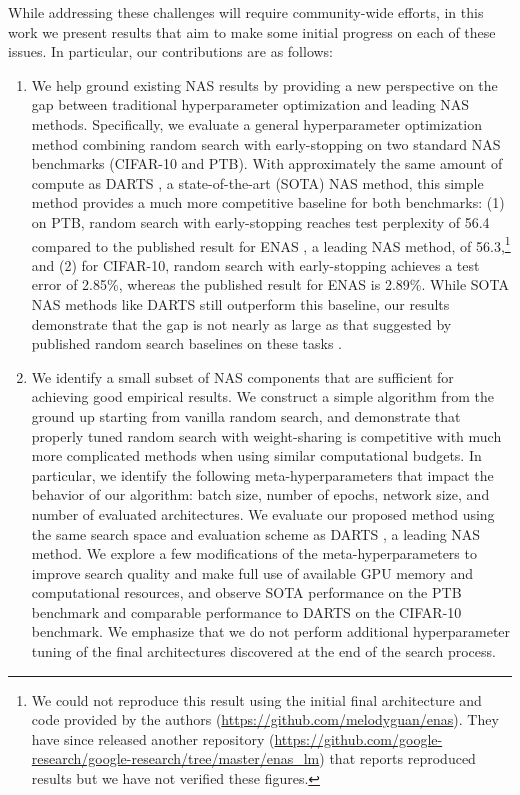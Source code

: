 \documentclass[acmlarge, nonacm]{acmart}
\begin{document}
While addressing these challenges will require community-wide efforts,
 in this work we present results that aim to make some initial progress on each of these issues. In particular, our contributions are as follows:
\begin{enumerate}[leftmargin=*]
    \item We help ground existing NAS results by providing a new perspective on the gap between traditional hyperparameter optimization and leading NAS methods. Specifically, we evaluate a general hyperparameter optimization method combining random search with early-stopping \citep{asha} on two standard NAS benchmarks (CIFAR-10 and PTB).  With approximately the same amount of compute as DARTS \citep{liu2018darts}, a state-of-the-art (SOTA) NAS method, this simple method provides a much more competitive baseline for both benchmarks: (1) on PTB, random search with early-stopping reaches test perplexity of 56.4 compared to the published result for ENAS \citep{pham18ENAS}, a leading NAS method, of 56.3,\footnote{We could not reproduce this result using the initial final architecture and code provided by the authors (\url{https://github.com/melodyguan/enas}).  They have since released another repository  (\url{https://github.com/google-research/google-research/tree/master/enas_lm}) that reports reproduced results but we have not verified these figures.} and (2) for CIFAR-10, random search with early-stopping achieves a test error of 2.85\%, whereas the published result for ENAS is 2.89\%.  While SOTA NAS methods like DARTS still outperform this baseline, our results demonstrate that the gap is not nearly as large as that suggested by published random search baselines on these tasks \citep{pham18ENAS,liu2018darts}.
    \item  We identify a small subset of NAS components that are sufficient for achieving good empirical results.  We construct a simple algorithm from the ground up starting from vanilla random search, 
    and demonstrate that properly tuned random search with weight-sharing is competitive with much more complicated methods when using similar computational budgets.  In particular, we identify the following meta-hyperparameters that impact the behavior of our algorithm: batch size, number of epochs, network size, and number of evaluated architectures. We  evaluate our proposed method using the same search space and evaluation scheme as DARTS \citep{liu2018darts}, a leading NAS method. We explore a few modifications of the meta-hyperparameters to improve search quality and make full use of available GPU memory and computational resources, and observe SOTA performance on the PTB benchmark and comparable performance to DARTS on the CIFAR-10 benchmark.  We emphasize that we do not perform additional hyperparameter tuning of the final architectures discovered at the end of the search process.

\end{enumerate}
\end{document}

